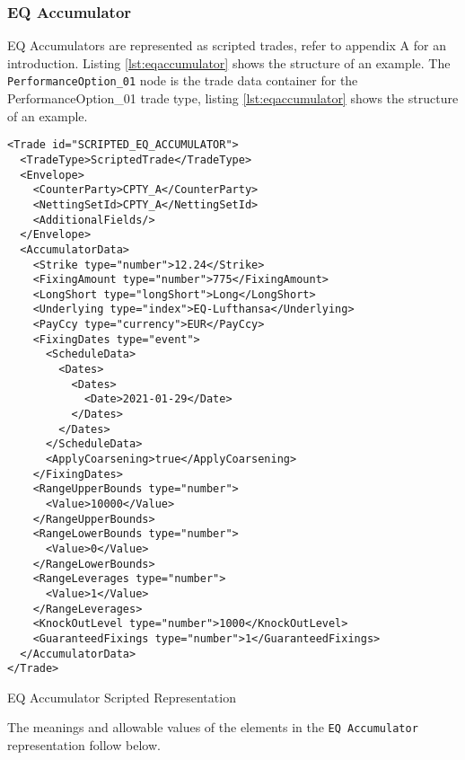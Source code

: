 \subsubsection{EQ Accumulator}

EQ Accumulators are represented as scripted trades, refer to appendix A for an introduction. Listing \ref{lst:eqaccumulator} shows the structure of an example.
The \verb+PerformanceOption_01+ node is the trade data container for the PerformanceOption\_01 trade type, listing
\ref{lst:eqaccumulator} shows the structure of an example.

\begin{listing}[H]
\begin{verbatim}
<Trade id="SCRIPTED_EQ_ACCUMULATOR">
  <TradeType>ScriptedTrade</TradeType>
  <Envelope>
    <CounterParty>CPTY_A</CounterParty>
    <NettingSetId>CPTY_A</NettingSetId>
    <AdditionalFields/>
  </Envelope>
  <AccumulatorData>
    <Strike type="number">12.24</Strike>
    <FixingAmount type="number">775</FixingAmount>
    <LongShort type="longShort">Long</LongShort>
    <Underlying type="index">EQ-Lufthansa</Underlying>
    <PayCcy type="currency">EUR</PayCcy>
    <FixingDates type="event">
      <ScheduleData>
        <Dates>
          <Dates>
            <Date>2021-01-29</Date>
          </Dates>
        </Dates>
      </ScheduleData>
      <ApplyCoarsening>true</ApplyCoarsening>
    </FixingDates>
    <RangeUpperBounds type="number">
      <Value>10000</Value>
    </RangeUpperBounds>
    <RangeLowerBounds type="number">
      <Value>0</Value>
    </RangeLowerBounds>
    <RangeLeverages type="number">
      <Value>1</Value>
    </RangeLeverages>
    <KnockOutLevel type="number">1000</KnockOutLevel>
    <GuaranteedFixings type="number">1</GuaranteedFixings> 
  </AccumulatorData>
</Trade>
\end{verbatim}
\caption{EQ Accumulator Scripted Representation}
\label{lst:eqaccumulator}
\end{listing}

The meanings and allowable values of the elements in the \verb+EQ Accumulator+  representation follow below.

